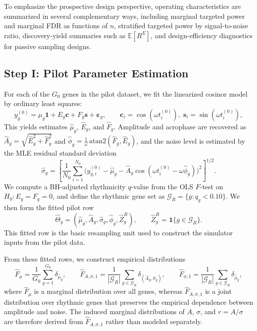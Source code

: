 \documentclass{article}
\begin{document}
To emphasize the prospective design perspective, operating characteristics are
summarized in several complementary ways, including marginal targeted power and
marginal FDR as functions of $n$, stratified targeted power by signal-to-noise
ratio, discovery-yield summaries such as $\mathbb{E}[R^E]$, and
design-efficiency diagnostics for passive sampling designs.

\subsection{Step I: Pilot Parameter Estimation}
\label{sec:pilot}

For each of the $G_0$ genes in the pilot dataset, we fit the linearized cosinor
model by ordinary least squares:
\begin{equation}
y_g^{(0)}=\mu_g\mathbf{1}+E_g\mathbf{c}+F_g\mathbf{s}+\boldsymbol\varepsilon_g,
\qquad
\mathbf{c}_i=\cos(\omega t_i^{(0)}),\;\mathbf{s}_i=\sin(\omega t_i^{(0)}),
\label{eq:pilot_fit}
\end{equation}
This yields estimates $\hat{\mu}_g$, $\hat{E}_g$, and $\hat{F}_g$.
Amplitude and acrophase are recovered as
\(\hat{A}_g=\sqrt{\hat{E}_g^2+\hat{F}_g^2}\) and
\(\hat{\phi}_g=\frac{1}{\omega}\,\mathrm{atan2}\!\left(\hat{F}_g,\hat{E}_g\right)\),
and the noise level is estimated by the MLE residual standard deviation
\begin{equation}
\hat{\sigma}_g
=
\left[
\frac{1}{N_0}\sum_{i=1}^{N_0}
\bigl(
y_{g,i}^{(0)}-\hat{\mu}_g-\hat{A}_g\cos(\omega t_i^{(0)}-\omega\hat{\phi}_g)
\bigr)^2
\right]^{1/2}.
\label{eq:pilot_sigma}
\end{equation}
We compute a BH-adjusted rhythmicity $q$-value from the OLS $F$-test on
$H_0:E_g=F_g=0$, and define the rhythmic gene set as
$\mathcal{G}_R=\{g:q_g<0.10\}$. We then form the fitted pilot row
\[
\hat{\Theta}_g=(\hat{\mu}_g,\hat{A}_g,\hat{\sigma}_g,\hat{\phi}_g,\hat{Z}_g^R),
\qquad
\hat{Z}_g^R=\mathbf{1}\{g\in\mathcal{G}_R\}.
\]
This fitted row is the basic resampling unit used to construct the simulator
inputs from the pilot data.

From these fitted rows, we construct empirical distributions
\begin{equation}
\hat{F}_\mu=\frac{1}{G_0}\sum_{g=1}^{G_0}\delta_{\hat{\mu}_g},
\qquad
\hat{F}_{A,\sigma,1}
=
\frac{1}{|\mathcal{G}_R|}\sum_{g\in\mathcal{G}_R}
\delta_{(\hat{A}_g,\hat{\sigma}_g)},
\qquad
\hat{F}_{\phi,1}
=
\frac{1}{|\mathcal{G}_R|}\sum_{g\in\mathcal{G}_R}\delta_{\hat{\phi}_g},
\label{eq:empirical_dists}
\end{equation}
where $\hat{F}_\mu$ is a marginal distribution over all genes, whereas
$\hat{F}_{A,\sigma,1}$ is a joint distribution over rhythmic genes that
preserves the empirical dependence between amplitude and noise. The induced
marginal distributions of $A$, $\sigma$, and $r=A/\sigma$ are therefore derived
from $\hat{F}_{A,\sigma,1}$ rather than modeled separately.
\end{document}
